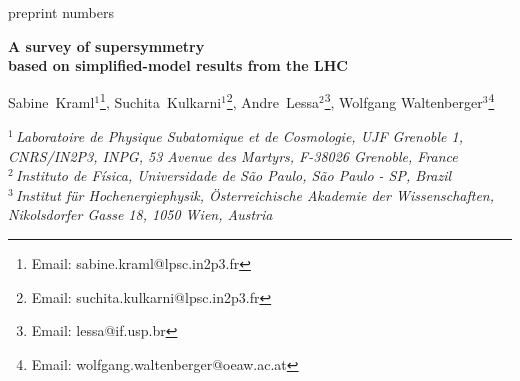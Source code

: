 \documentclass[12pt]{article}
\begin{document}
\begin{center}


\begin{flushright}
preprint numbers
\end{flushright}

\vspace*{1.6cm}
{\Large\bf A survey of supersymmetry\\[3mm] based on simplified-model results from the LHC} 

\vspace*{1cm}\renewcommand{\thefootnote}{\fnsymbol{footnote}}

{\large 
Sabine~Kraml$^{1}$\footnote[1]{Email: sabine.kraml@lpsc.in2p3.fr},
Suchita~Kulkarni$^{1}$\footnote[2]{Email: suchita.kulkarni@lpsc.in2p3.fr},
Andre~Lessa$^{2}$\footnote[3]{Email: lessa@if.usp.br},
Wolfgang Waltenberger$^{3}$\footnote[4]{Email: wolfgang.waltenberger@oeaw.ac.at}
} 

\renewcommand{\thefootnote}{\arabic{footnote}}

\vspace*{1cm} 
{\normalsize \it 
$^1\,$Laboratoire de Physique Subatomique et de Cosmologie, UJF Grenoble 1,
CNRS/IN2P3, INPG, 53 Avenue des Martyrs, F-38026 Grenoble, France\\[2mm]
$^2\,$Instituto de F\'isica, Universidade de S\~ao Paulo, S\~ao Paulo - SP, Brazil\\[2mm]
$^3\,$Institut f\"ur Hochenergiephysik,  \"Osterreichische Akademie der Wissenschaften,\\ Nikolsdorfer Gasse 18, 1050 Wien, Austria\\[1mm]
}

\vspace{1cm}

\begin{abstract}
We present a general procedure to decompose any Beyond the Standard Model (BSM) collider signatures presenting
a $\mathbb{Z}_2$ symmetry into Simplified Model Spectrum topologies. Our method provides a way
to cast any BSM predictions for the LHC in a model independent framework, which can be directly
confronted with experimental constraints. As a show-case example we apply
our procedure to 7-parameter realization of the MSSM and discuss some of the consequences
of the current LHC constraints.
\end{abstract}

\end{center}
\end{document}
